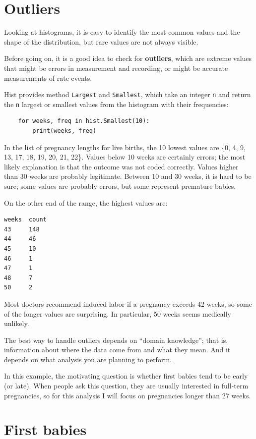 \documentclass[12pt]{book}
\begin{document}
\section{Outliers}

Looking at histograms, it is easy to identify the most common
values and the shape of the distribution, but rare values are
not always visible.

Before going on, it is a good idea to check for {\bf
  outliers}, which are extreme values that might be errors in
measurement and recording, or might be accurate measurements of rate
events.

Hist provides method {\tt Largest} and {\tt Smallest}, which take
an integer {\tt n} and return the {\tt n} largest or smallest
values from the histogram with their frequencies:

\begin{verbatim}
    for weeks, freq in hist.Smallest(10):
        print(weeks, freq)
\end{verbatim}

In the list of pregnancy lengths for live births, the 10 lowest values
are \{0, 4, 9, 13, 17, 18, 19, 20, 21, 22\}.  Values below 10 weeks
are certainly errors; the most likely explanation is that the outcome
was not coded correctly.  Values higher than 30 weeks are probably
legitimate.  Between 10 and 30 weeks, it is hard to be sure; some
values are probably errors, but some represent premature babies.

On the other end of the range, the highest values are:
%
\begin{verbatim}
weeks  count
43     148
44     46
45     10
46     1
47     1
48     7
50     2
\end{verbatim}

Most doctors recommend induced labor if a pregnancy exceeds 42 weeks,
so some of the longer values are surprising.  In particular, 50 weeks
seems medically unlikely.

The best way to handle outliers depends on ``domain knowledge'';
that is, information about where the data come from and what they
mean.  And it depends on what analysis you are planning to perform.

In this example, the motivating question is whether first babies
tend to be early (or late).  When people ask this question, they are
usually interested in full-term pregnancies, so for this analysis
I will focus on pregnancies longer than 27 weeks.


\section{First babies}
\end{document}
